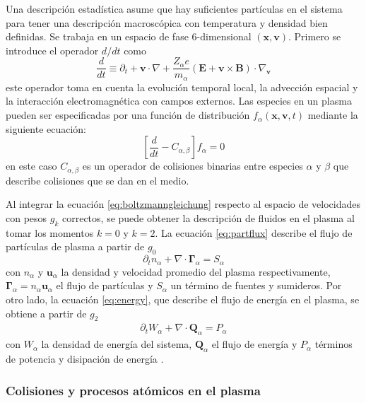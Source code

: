 Una descripción estadística asume que hay suficientes partículas en el sistema para tener una descripción macroscópica con temperatura y densidad bien definidas. Se trabaja en un espacio de fase 6-dimensional $(\bm{x}, \bm{v})$. Primero se introduce el operador $d/dt $ como
\begin{equation}
	\frac{d}{dt} \equiv \partial_t + \textbf{v}\cdot\nabla + \frac{Z_\alpha e}{m_\alpha}(\textbf{E} + \textbf{v}\times\textbf{B})\cdot \nabla_\textbf{v}
\end{equation}
este operador toma en cuenta la evolución temporal local, la advección espacial y la interacción electromagnética con campos externos. Las especies en un plasma pueden ser especificadas por una función de distribución $f_\alpha(\bm{x}, \bm{v}, t)$ mediante la siguiente ecuación:
 \begin{equation}\label{eq:boltzmanngleichung}                                                                                          
    \left[\frac{d}{dt} - C_{\alpha,\beta}\right]f_\alpha = 0
  \end{equation}
en este caso $C_{\alpha, \beta}$ es un operador de colisiones binarias entre especies $\alpha$ y $\beta$ que describe colisiones que se dan en el medio.

Al integrar la ecuación \eqref{eq:boltzmanngleichung} respecto al espacio de velocidades con pesos $g_k$ correctos, se puede obtener la descripción de fluidos en el plasma al tomar los momentos $k=0$ y $k=2$. La ecuación \eqref{eq:partflux} describe el flujo de partículas de plasma a partir de $g_0$
\begin{equation}\label{eq:partflux}
	\partial_t n_\alpha + \nabla\cdot\bm{\Gamma}_\alpha = S_\alpha
\end{equation}
con $n_\alpha$ y $\bm{u}_\alpha$ la densidad y velocidad promedio del plasma respectivamente, $\bm{\Gamma}_\alpha = n_\alpha\bm{u}_\alpha$ el flujo de partículas y $S_\alpha$ un término de fuentes y sumideros. Por otro lado, la ecuación \eqref{eq:energy}, que describe el flujo de energía en el plasma, se obtiene a partir de $g_2$ 
\begin{eqnarray}\label{eq:energy}
	\partial_t W_\alpha + \nabla\cdot\bm{Q}_\alpha =  P_\alpha
\end{eqnarray}
con $W_\alpha$ la densidad de energía del sistema, $\bm{Q}_\alpha$ el flujo de energía y $P_\alpha$ términos de potencia y disipación de energía \cite{helander2005, freidberg2014}. 

\subsubsection{Colisiones y procesos atómicos en el plasma}


